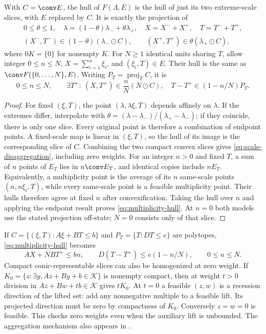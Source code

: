 \begin{proposition}\label{prop:scale-hull}
With $C=\conv E$, the hull of $F(\Lambda,E)$ is the hull of just its two
extreme-scale slices, with $E$ replaced by $C$. It is exactly the projection
of
\begin{equation}\label{eq:scale-disaggregation}
 \begin{gathered}
 0\le\theta\le1,\quad\lambda=(1-\theta)\lambda_-+\theta\lambda_+,
 \quad X=X^-+X^+,\quad T=T^-+T^+,\\
 (X^-,T^-)\in(1-\theta)(\lambda_-\odot C),\qquad
 (X^+,T^+)\in\theta(\lambda_+\odot C),
 \end{gathered}
\end{equation}
where $0K=\{0\}$ for nonempty $K$. For $N\ge1$ identical units sharing
$T$, allow integer $0\le n\le N$, $X=\sum_{i=1}^n\xi_i$, and
$(\xi_i,T)\in E$. Their hull is the same as $\conv F(\{0,\ldots,N\},E)$.
Writing $P_T=\operatorname{proj}_T C$, it is
\begin{equation}\label{eq:multiplicity-hull}
 0\le n\le N,\qquad
 \exists T^+:\ (X,T^+)\in\frac nN(N\odot C),\quad
 T-T^+\in(1-n/N)P_T.
\end{equation}
\end{proposition}
\begin{proof}
For fixed $(\xi,T)$, the point $(\lambda,\lambda\xi,T)$ depends affinely
on $\lambda$. If the extremes differ, interpolate with
$\theta=(\lambda-\lambda_-)/(\lambda_+-\lambda_-)$; if they coincide,
there is only one slice. Every original point is therefore a combination
of endpoint points. A fixed-scale map is linear in $(\xi,T)$, so the
hull of its image is the corresponding slice of $C$. Combining the two
compact convex slices gives
\eqref{eq:scale-disaggregation}, including zero weights.
For an integer $n>0$ and fixed $T$, a sum of $n$ points of $E_T$ lies in
$n\conv E_T$, and identical copies include $n E_T$. Equivalently, a
multiplicity point is the average of its $n$ same-scale points
$(n,n\xi_i,T)$, while every same-scale point is a feasible multiplicity
point. Their hulls therefore agree at fixed $n$ after convexification.
Taking the hull over $n$ and applying the endpoint result proves
\eqref{eq:multiplicity-hull}. At $n=0$ both models use the stated
projection off-state; $N=0$ consists only of that slice.
\end{proof}
If $C=\{(\xi,T):A\xi+BT\le b\}$ and $P_T=\{T:DT\le e\}$ are
polytopes, \eqref{eq:multiplicity-hull} becomes
\[
 AX+NB T^+\le bn,\qquad D(T-T^+)\le e(1-n/N),\qquad0\le n\le N.
\]
Compact conic-representable slices can also be homogenized at zero
weight. If $K_0=\{z:\exists y,Az+By+b\in\mathcal K\}$ is nonempty compact,
then at weight $t>0$ division in $Az+Bw+tb\in\mathcal K$ gives $tK_0$.
At $t=0$ a feasible $(z,w)$ is a recession direction of the lifted set:
add any nonnegative multiple to a feasible lift. Its projected direction
must be zero by compactness of $K_0$. Conversely $z=w=0$ is feasible.
This checks zero weights even when the auxiliary lift is unbounded.
The aggregation mechanism also appears in \citet[Section 4.1, Lemma 3
and Theorem 3, under Assumption 1]{WuEtAl2026}.

